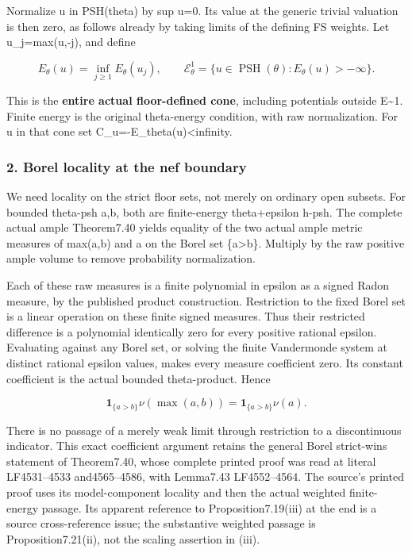 \documentclass[
]{article}
\begin{document}
Normalize u in PSH(theta) by sup u=0. Its value at the generic trivial
valuation is then zero, as follows already by taking limits of the
defining FS weights. Let u\_j=max(u,-j), and define

\[E_\theta(u)=\inf_{j\geq1}E_\theta(u_j),\qquad
\mathcal E^1_\theta=\{u\in\operatorname{PSH}(\theta):E_\theta(u)>-\infty\}.\]

This is the \textbf{entire actual floor-defined cone}, including
potentials outside E\textasciitilde1. Finite energy is the original
theta-energy condition, with raw normalization. For u in that cone set
C\_u=-E\_theta(u)\textless infinity.

\subsubsection{2. Borel locality at the nef
boundary}\label{borel-locality-at-the-nef-boundary}

We need locality on the strict floor sets, not merely on ordinary open
subsets. For bounded theta-psh a,b, both are finite-energy theta+epsilon
h-psh. The complete actual ample Theorem7.40 yields equality of the two
actual ample metric measures of max(a,b) and a on the Borel set
\{a\textgreater b\}. Multiply by the raw positive ample volume to remove
probability normalization.

Each of these raw measures is a finite polynomial in epsilon as a signed
Radon measure, by the published product construction. Restriction to the
fixed Borel set is a linear operation on these finite signed measures.
Thus their restricted difference is a polynomial identically zero for
every positive rational epsilon. Evaluating against any Borel set, or
solving the finite Vandermonde system at distinct rational epsilon
values, makes every measure coefficient zero. Its constant coefficient
is the actual bounded theta-product. Hence

\[\mathbf1_{\{a>b\}}\nu(\max(a,b))=
\mathbf1_{\{a>b\}}\nu(a).\]

There is no passage of a merely weak limit through restriction to a
discontinuous indicator. This exact coefficient argument retains the
general Borel strict-wins statement of Theorem7.40, whose complete
printed proof was read at literal LF4531--4533 and4565--4586, with
Lemma7.43 LF4552--4564. The source's printed proof uses its
model-component locality and then the actual weighted finite-energy
passage. Its apparent reference to Proposition7.19(iii) at the end is a
source cross-reference issue; the substantive weighted passage is
Proposition7.21(ii), not the scaling assertion in (iii).
\end{document}
